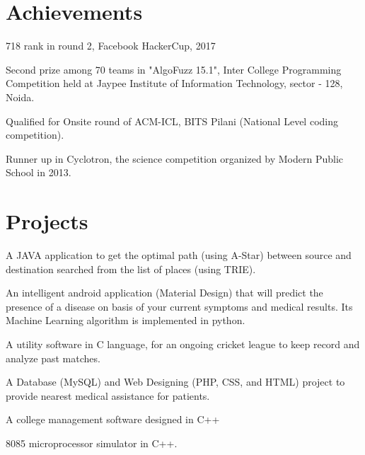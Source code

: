 \documentclass[]{hieudo-build}
\begin{document}
\begin{minipage}[t]{0.69\textwidth}
\section{Achievements}

\vspace{0.5em} 
\begin{tightemize}
\item 718 rank in round 2, Facebook HackerCup, 2017
\item Second prize among 70 teams in "AlgoFuzz 15.1", Inter College Programming Competition held at Jaypee Institute of Information Technology, sector - 128, Noida.
\item Qualified for Onsite round of ACM-ICL, BITS Pilani (National Level coding competition).
\item Runner up in Cyclotron, the science competition organized by Modern Public School in 2013.
\end{tightemize}
\sectionsep


\section{Projects}

\descript{}
A JAVA application to get the optimal path (using A-Star) between source and destination searched from the list of places (using TRIE).
\sectionsep

\descript{}
An intelligent android application (Material Design) that will predict the presence of a disease on basis of your current symptoms and medical results. Its Machine Learning algorithm is implemented in python.
\sectionsep

\descript{}
A utility software in C language, for an ongoing cricket league to keep record and analyze past matches.
\sectionsep 

\descript{}
A Database (MySQL) and Web Designing (PHP, CSS, and HTML) project to provide nearest medical assistance for patients.
\sectionsep

\descript{}
A college management software designed in C++%
\sectionsep 

\descript{}
8085 microprocessor simulator in C++.
\sectionsep 

\end{minipage} 
\end{document}
